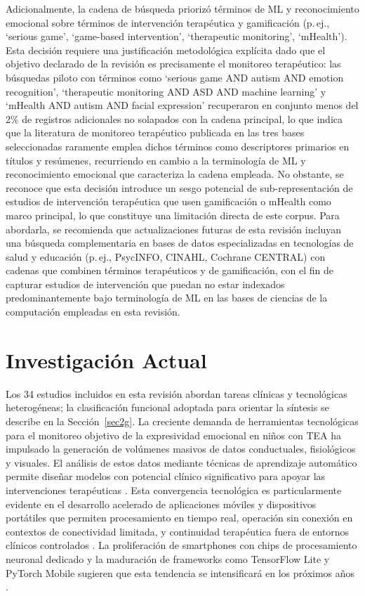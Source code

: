 \documentclass[3p,twocolumn,times]{elsarticle}
\begin{document}
	Adicionalmente, la cadena de búsqueda priorizó términos de ML y reconocimiento
	emocional sobre términos de intervención terapéutica y gamificación (p.\,ej.,
	`serious game', `game-based intervention', `therapeutic monitoring', `mHealth').
	Esta decisión requiere una justificación metodológica explícita dado que el
	objetivo declarado de la revisión es precisamente el monitoreo terapéutico: las
	búsquedas piloto con términos como `serious game AND autism AND emotion
	recognition', `therapeutic monitoring AND ASD AND machine learning' y `mHealth
	AND autism AND facial expression' recuperaron en conjunto menos del 2\% de
	registros adicionales no solapados con la cadena principal, lo que indica que la
	literatura de monitoreo terapéutico publicada en las tres bases seleccionadas
	raramente emplea dichos términos como descriptores primarios en títulos y
	resúmenes, recurriendo en cambio a la terminología de ML y reconocimiento
	emocional que caracteriza la cadena empleada. No obstante, se reconoce que esta
	decisión introduce un sesgo potencial de sub-representación de estudios de
	intervención terapéutica que usen gamificación o mHealth como marco principal, lo
	que constituye una limitación directa de este corpus. Para abordarla, se
	recomienda que actualizaciones futuras de esta revisión incluyan una búsqueda
	complementaria en bases de datos especializadas en tecnologías de salud y
	educación (p.\,ej., PsycINFO, CINAHL, Cochrane CENTRAL) con cadenas que combinen
	términos terapéuticos y de gamificación, con el fin de capturar estudios de
	intervención que puedan no estar indexados predominantemente bajo terminología de
	ML en las bases de ciencias de la computación empleadas en esta revisión.
	
	\section{Investigación Actual}\label{sec3}
	
	Los 34 estudios incluidos en esta revisión abordan tareas clínicas y tecnológicas
	heterogéneas; la clasificación funcional adoptada para orientar la síntesis se
	describe en la Sección~\ref{sec2g}. La creciente demanda de herramientas
	tecnológicas para el monitoreo objetivo de la expresividad emocional en niños con
	TEA ha impulsado la generación de volúmenes masivos de datos conductuales,
	fisiológicos y visuales. El análisis de estos datos mediante técnicas de aprendizaje
	automático permite diseñar modelos con potencial clínico significativo para apoyar
	las intervenciones terapéuticas \cite{Johnson2025}. Esta convergencia tecnológica es
	particularmente evidente en el desarrollo acelerado de aplicaciones móviles y
	dispositivos portátiles que permiten procesamiento en tiempo real, operación sin
	conexión en contextos de conectividad limitada, y continuidad terapéutica fuera de
	entornos clínicos controlados \cite{Levy2024}. La proliferación de smartphones con
	chips de procesamiento neuronal dedicado y la maduración de frameworks como
	TensorFlow Lite y PyTorch Mobile sugieren que esta tendencia se intensificará en
	los próximos años \cite{Levy2024}.
	
\end{document}

